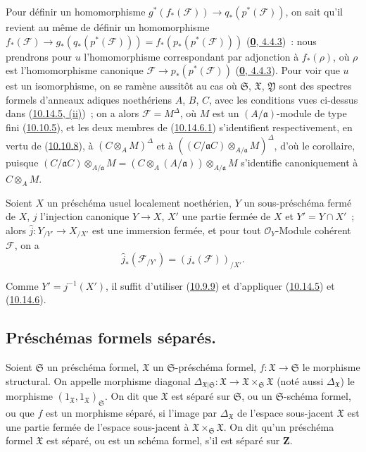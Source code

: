 Pour définir un homomorphisme
$g^*(f_*(\mathscr{F}))\to q_*(p^*(\mathscr{F}))$, on sait qu'il revient au
même de définir un homomorphisme
$f_*(\mathscr{F})\to g_*(q_*(p^*(\mathscr{F})))
=f_*(p_*(p^*(\mathscr{F})))$
(\hyperref[0.4.4.3-fr]{\textbf{0}, 4.4.3})~: nous prendrons pour $u$ l'homomorphisme correspondant par adjonction à $f_*(\rho)$, où $\rho$
est l'homomorphisme canonique
$\mathscr{F}\to p_*(p^*(\mathscr{F}))$
(\hyperref[0.4.4.3-fr]{\textbf{0}, 4.4.3}). Pour voir que $u$ est un isomorphisme, on
se ramène aussitôt au cas où $\mathfrak{S}$, $\mathfrak{X}$,
$\mathfrak{Y}$ sont des spectres formels d'anneaux adiques noethériens $A$,
$B$, $C$, avec les conditions vues ci-dessus dans
(\hyperref[I.10.14.5-fr]{10.14.5, (ii)})~; on a alors
$\mathscr{F}=M^\Delta$, où $M$ est un $(A/\mathfrak{a})$-module de type fini
(\hyperref[I.10.10.5-fr]{10.10.5}), et les deux membres de
(\hyperref[I.10.14.6.1-fr]{10.14.6.1}) s'identifient respectivement, en vertu
de (\hyperref[I.10.10.8-fr]{10.10.8}), à
$(C\otimes_A M)^\Delta$ et à
$((C/\mathfrak{a}C)\otimes_{A/\mathfrak{a}}M)^\Delta$, d'où le corollaire,
puisque
$(C/\mathfrak{a}C)\otimes_{A/\mathfrak{a}}M
=(C\otimes_A(A/\mathfrak{a}))\otimes_{A/\mathfrak{a}}M$ s'identifie
canoniquement à $C\otimes_A M$.

\begin{corollary}[10.14.7]
\label{I.10.14.7-fr}
Soient $X$ un préschéma usuel localement noethérien, $Y$ un sous-préschéma
fermé de $X$, $j$ l'injection canonique $Y\to X$, $X'$ une partie fermée de
$X$ et $Y'=Y\cap X'$~; alors
$\widehat{j}:Y_{/Y'}\to X_{/X'}$ est une immersion fermée, et pour tout
$\mathscr{O}_Y$-Module cohérent $\mathscr{F}$, on a
\[
  \widehat{j}_*(\mathscr{F}_{/Y'})=(j_*(\mathscr{F}))_{/X'}.
\]
\end{corollary}

Comme $Y'=j^{-1}(X')$, il suffit d'utiliser
(\hyperref[I.10.9.9-fr]{10.9.9}) et d'appliquer
(\hyperref[I.10.14.5-fr]{10.14.5}) et
(\hyperref[I.10.14.6-fr]{10.14.6}).

\subsection{Préschémas formels séparés.}
\label{subsection:I.10.15-fr}

\begin{definition}[10.15.1]
\label{I.10.15.1-fr}
Soient $\mathfrak{S}$ un préschéma formel, $\mathfrak{X}$ un
$\mathfrak{S}$-préschéma formel,
$f:\mathfrak{X}\to\mathfrak{S}$ le morphisme structural. On appelle
morphisme diagonal
$\Delta_{\mathfrak{X}|\mathfrak{S}}:\mathfrak{X}\to
\mathfrak{X}\times_{\mathfrak{S}}\mathfrak{X}$ (noté aussi
$\Delta_{\mathfrak{X}}$) le morphisme
$(1_{\mathfrak{X}},1_{\mathfrak{X}})_{\mathfrak{S}}$. On dit que
$\mathfrak{X}$ est séparé sur $\mathfrak{S}$, ou un
$\mathfrak{S}$-schéma formel, ou que $f$ est un morphisme séparé, si l'image
par $\Delta_{\mathfrak{X}}$ de l'espace sous-jacent $\mathfrak{X}$ est une
partie fermée de l'espace sous-jacent à
$\mathfrak{X}\times_{\mathfrak{S}}\mathfrak{X}$. On dit qu'un préschéma
formel $\mathfrak{X}$ est séparé, ou est un schéma formel, s'il est séparé
sur $\mathbf{Z}$.
\end{definition}

